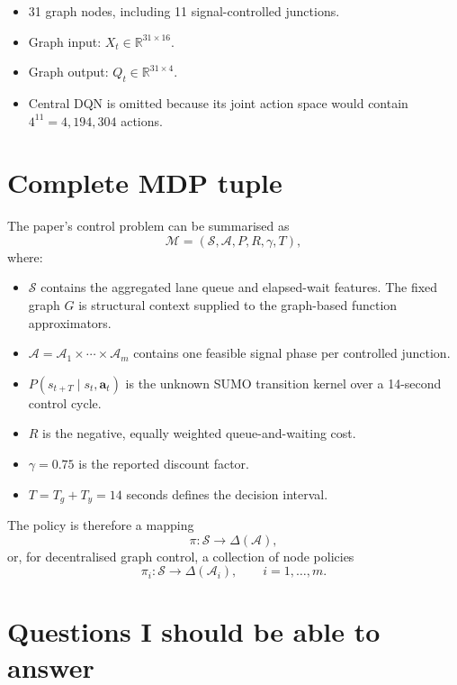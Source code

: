 \documentclass[11pt]{article}
\begin{document}
\begin{itemize}
    \item 31 graph nodes, including 11 signal-controlled junctions.
    \item Graph input: $X_t\in\mathbb{R}^{31\times16}$.
    \item Graph output: $Q_t\in\mathbb{R}^{31\times4}$.
    \item Central DQN is omitted because its joint action space would contain $4^{11}=4{,}194{,}304$ actions.
\end{itemize}

\section{Complete MDP tuple}

The paper's control problem can be summarised as
\begin{equation}
\mathcal{M}
=
\left(
\mathcal{S},
\mathcal{A},
P,
R,
\gamma,
T
\right),
\end{equation}
where:
\begin{itemize}
    \item $\mathcal{S}$ contains the aggregated lane queue and elapsed-wait features. The fixed graph $G$ is structural context supplied to the graph-based function approximators.
    \item $\mathcal{A}=\mathcal{A}_1\times\cdots\times\mathcal{A}_m$ contains one feasible signal phase per controlled junction.
    \item $P(s_{t+T}\mid s_t,\mathbf{a}_t)$ is the unknown SUMO transition kernel over a 14-second control cycle.
    \item $R$ is the negative, equally weighted queue-and-waiting cost.
    \item $\gamma=0.75$ is the reported discount factor.
    \item $T=T_g+T_y=14$ seconds defines the decision interval.
\end{itemize}

The policy is therefore a mapping
\begin{equation}
\pi:\mathcal{S}\longrightarrow\Delta(\mathcal{A}),
\end{equation}
or, for decentralised graph control, a collection of node policies
\begin{equation}
\pi_i:\mathcal{S}\longrightarrow\Delta(\mathcal{A}_i),
\qquad i=1,\ldots,m.
\end{equation}

\section{Questions I should be able to answer}
\end{document}
